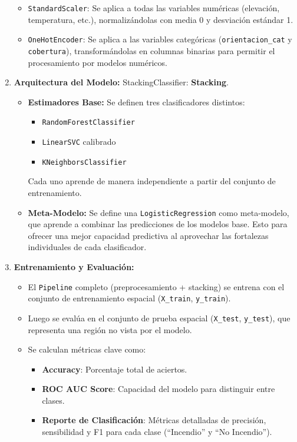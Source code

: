 \documentclass[a4paper,10pt]{article}
\begin{document}
\begin{multicols}{2}
\begin{enumerate}
    \begin{itemize}
        \item \texttt{StandardScaler}: Se aplica a todas las variables numéricas (elevación, temperatura, etc.), normalizándolas con media 0 y desviación estándar 1.
        \item \texttt{OneHotEncoder}: Se aplica a las variables categóricas (\texttt{orientacion\_cat} y \texttt{cobertura}), transformándolas en columnas binarias para permitir el procesamiento por modelos numéricos.
    \end{itemize}

    \item \textbf{Arquitectura del Modelo:} StackingClassifier: \textbf{Stacking}.
    
    \begin{itemize}
        \item \textbf{Estimadores Base:} Se definen tres clasificadores distintos:
        \begin{itemize}
            \item \texttt{RandomForestClassifier}
            \item \texttt{LinearSVC} calibrado
            \item \texttt{KNeighborsClassifier}
        \end{itemize}
        Cada uno aprende de manera independiente a partir del conjunto de entrenamiento.

        \item \textbf{Meta-Modelo:} Se define una \texttt{LogisticRegression} como meta-modelo, que aprende a combinar las predicciones de los modelos base. Esto para ofrecer una mejor capacidad predictiva al aprovechar las fortalezas individuales de cada clasificador.
    \end{itemize}

    \item \textbf{Entrenamiento y Evaluación:}
    \begin{itemize}
        \item El \texttt{Pipeline} completo (preprocesamiento + stacking) se entrena con el conjunto de entrenamiento espacial (\texttt{X\_train}, \texttt{y\_train}).
        \item Luego se evalúa en el conjunto de prueba espacial (\texttt{X\_test}, \texttt{y\_test}), que representa una región no vista por el modelo.
        \item Se calculan métricas clave como:
        \begin{itemize}
            \item \textbf{Accuracy}: Porcentaje total de aciertos.
            \item \textbf{ROC AUC Score}: Capacidad del modelo para distinguir entre clases.
            \item \textbf{Reporte de Clasificación}: Métricas detalladas de precisión, sensibilidad y F1 para cada clase (``Incendio'' y ``No Incendio'').
        \end{itemize}
    \end{itemize}
\end{enumerate}


\end{multicols}
\end{document}
